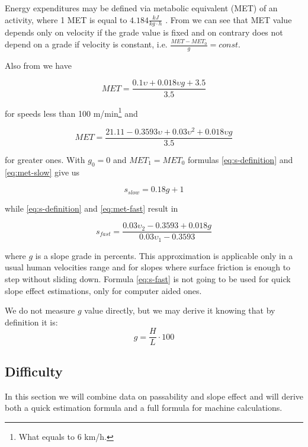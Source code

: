 \documentclass[12pt]{article}
\begin{document}
Energy expenditures may be defined via metabolic equivalent (MET) of an activity, where 1 MET is equal to $4.184\frac{kJ}{kg\cdot{h}}$ \cite{wiki-met}. From \cite{acsm-guidelines} we can see that MET value depends only on velocity if the grade value is fixed and on contrary does not depend on a grade if velocity is constant, i.e. $\frac{MET-MET_{0}}{g} = const$.

Also from \cite{acsm-guidelines} we have

\begin{equation} \label{eq:met-slow}
MET=\frac{0.1\upsilon+0.018\upsilon g + 3.5}{3.5}
\end{equation}

for speeds less than 100 m/min\footnote{What equals to 6 km/h.} and

\begin{equation} \label{eq:met-fast}
MET=\frac{21.11 - 0.3593\upsilon + 0.03\upsilon^{2} + 0.018\upsilon g}{3.5}
\end{equation}

for greater ones. With $g_{0} = 0$ and $MET_{1} = MET_{0}$ formulas \ref{eq:s-definition} and \ref{eq:met-slow} give us

\begin{equation} \label{eq:s-slow}
s_{slow} = 0.18g + 1
\end{equation}

while \ref{eq:s-definition} and \ref{eq:met-fast} result in

\begin{equation} \label{eq:s-fast}
s_{fast} = \frac{0.03\upsilon_{2}-0.3593 + 0.018g}{0.03\upsilon_{1}-0.3593}
\end{equation}

where $g$ is a slope grade in percents. This approximation is applicable only in a usual human velocities range and for slopes where surface friction is enough to step without sliding down. Formula \ref{eq:s-fast} is not going to be used for quick slope effect estimations, only for computer aided ones. 

We do not measure $g$ value directly, but we may derive it knowing that by definition \cite{wiki-grade} it is:
\begin{equation} \label{eq:g-def}
g = \frac{H}{L} \cdot 100
\end{equation}


\subsection{Difficulty}
In this section we will combine data on passability and slope effect and will derive both a quick estimation formula and a full formula for machine calculations.
\end{document}
